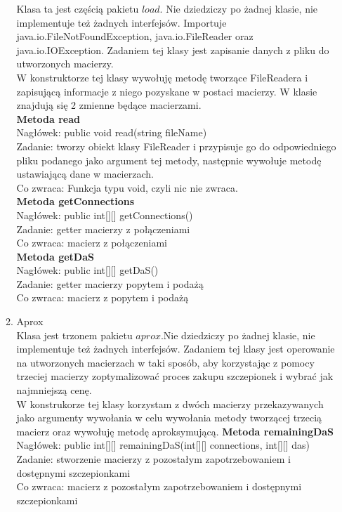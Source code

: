 \documentclass[11pt]{article}
\begin{document}
\begin{enumerate}
\begin{enumerate}[label=\arabic{enumi}.\arabic*.]
 Klasa ta jest częścią pakietu $load$. Nie dziedziczy po żadnej klasie, nie implementuje też żadnych interfejsów. Importuje java.io.FileNotFoundException,  java.io.FileReader oraz java.io.IOException. Zadaniem tej klasy jest zapisanie danych z pliku do utworzonych macierzy.\\
W konstruktorze tej klasy wywołuję metodę tworzące FileReadera i zapisującą informacje z niego pozyskane w postaci macierzy. W klasie znajdują się 2 zmienne będące macierzami.\\
 \textbf{Metoda read}\\
Nagłówek: public void read(string fileName)\\
Zadanie: tworzy obiekt klasy FileReader i przypisuje go do odpowiedniego pliku podanego jako argument tej metody, następnie wywołuje metodę ustawiającą dane w macierzach.\\
Co zwraca: Funkcja typu void, czyli nic nie zwraca.\\
 \textbf{Metoda getConnections}\\
Nagłówek: public int[][] getConnections()\\
Zadanie: getter macierzy z połączeniami\\
Co zwraca: macierz z połączeniami\\
 \textbf{Metoda getDaS}\\
Nagłówek: public int[][] getDaS()\\
Zadanie: getter macierzy popytem i podażą\\
Co zwraca: macierz z popytem i podażą\\
 \item Aprox\\
Klasa jest trzonem pakietu $aprox$.Nie dziedziczy po żadnej klasie, nie implementuje też żadnych interfejsów. Zadaniem tej klasy jest operowanie na utworzonych macierzach w taki sposób, aby korzystając z pomocy trzeciej macierzy zoptymalizować proces zakupu szczepionek i wybrać jak najmniejszą cenę.\\
W konstrukorze tej klasy korzystam z dwóch macierzy przekazywanych jako argumenty wywołania w celu wywołania metody tworzącej trzecią macierz oraz wywołuję metodę aproksymującą.
 \textbf{Metoda remainingDaS}\\
Nagłówek: public int[][] remainingDaS(int[][] connections, int[][] das)\\
Zadanie: stworzenie macierzy z pozostałym zapotrzebowaniem i dostępnymi szczepionkami\\
Co zwraca: macierz z pozostałym zapotrzebowaniem i dostępnymi szczepionkami\\

\end{enumerate}
\end{enumerate}
\end{document}
